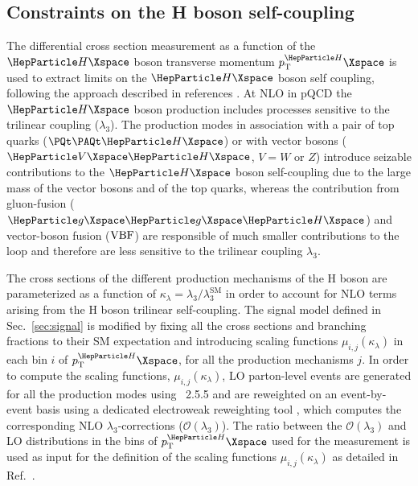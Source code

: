 \subsection{Constraints on the H boson self-coupling}
The differential cross section measurement as a function of the $\PH$ boson transverse momentum $\pt^\PH$ is used to extract limits on the  $\PH$ boson self coupling, following the approach described in references \cite{Degrassi:2016wml,Maltoni:2017ims,DiVita:2017eyz}.
At NLO in pQCD the $\PH$ boson production includes processes sensitive to the trilinear coupling ($\lambda_3$). 
The production modes in association with a pair of top quarks ($\ttH$) or with vector bosons ($\VH$, $V=W$ or $Z$) introduce seizable contributions to the $\PH$ boson self-coupling due to the large mass of the vector bosons and of the top quarks, whereas the contribution from gluon-fusion ($\ggH$) and vector-boson fusion ($\mathrm{VBF}$) are responsible of much smaller contributions to the loop and therefore are less sensitive to the trilinear coupling $\lambda_3$.

The cross sections of the different production mechanisms of the H boson are parameterized as a function of $\kappa_\lambda = \lambda_3/\lambda_3^\text{SM}$ in order to account for NLO terms arising from the H boson trilinear self-coupling.
The signal model defined in Sec.~\ref{sec:signal} is modified by fixing all the cross sections and branching fractions to their SM expectation and introducing scaling functions $\mu_{i,j}(\kappa_\lambda)$ in each bin $i$ of $\pt^\PH$, for all the production mechanisms $j$.
In order to compute the scaling functions, $\mu_{i,j}(\kappa_\lambda)$, LO parton-level events are generated for all the production modes using \MGvATNLO~2.5.5 and are reweighted on an event-by-event basis using a dedicated electroweak reweighting tool \cite{EWKReweight}, which computes the corresponding NLO $\lambda_3$-corrections ($\mathcal{O}(\lambda_3)$).
The ratio between the $\mathcal{O}(\lambda_3)$ and LO distributions in the bins of $\pt^\PH$ used for the measurement is used as input for the definition of the scaling functions $\mu_{i,j}(\kappa_\lambda)$ as detailed in Ref.~\cite{Maltoni:2017ims}.

